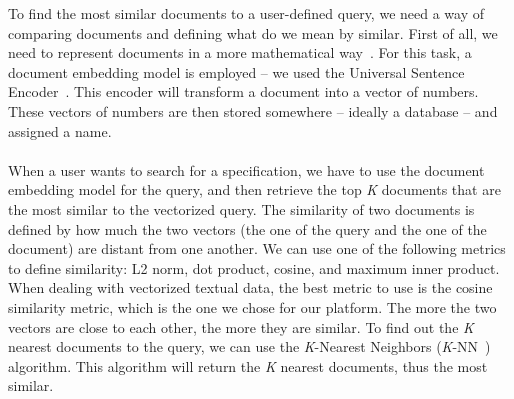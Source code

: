 To find the most similar documents to a user-defined query, we need a way of comparing documents and defining what do we mean by similar.
First of all, we need to represent documents in a more mathematical way~\cite{}.
For this task, a document embedding model is employed -- we used the Universal Sentence Encoder~\cite{cer2018universal}.
This encoder will transform a document into a vector of numbers.
These vectors of numbers are then stored somewhere -- ideally a database -- and assigned a name. \\ \\
When a user wants to search for a specification, we have to use the document embedding model for the query, and then retrieve the top \textit{K} documents that are the most similar to the vectorized query.
The similarity of two documents is defined by how much the two vectors (the one of the query and the one of the document) are distant from one another.
We can use one of the following metrics to define similarity: L2 norm, dot product, cosine, and maximum inner product.
When dealing with vectorized textual data, the best metric to use is the cosine similarity metric, which is the one we chose for our platform.
The more the two vectors are close to each other, the more they are similar.
To find out the \textit{K} nearest documents to the query, we can use the \textit{K}-Nearest Neighbors (\textit{K}-NN~\cite{}) algorithm.
This algorithm will return the \textit{K} nearest documents, thus the most similar.